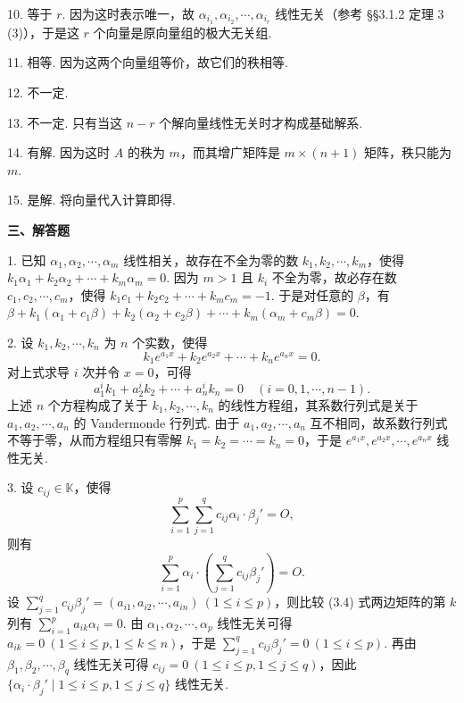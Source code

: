\documentclass[UTF8, 12pt, fontset=fandol, oneside]{ctexart}
\begin{document}
10. 等于 $r$. 因为这时表示唯一，故 $\alpha_{i_1},\alpha_{i_2},\cdots,\alpha_{i_r}$ 线性无关（参考 §§3.1.2 定理 3 (3)），于是这 $r$ 个向量是原向量组的极大无关组.

11. 相等. 因为这两个向量组等价，故它们的秩相等.

12. 不一定.

13. 不一定. 只有当这 $n-r$ 个解向量线性无关时才构成基础解系.

14. 有解. 因为这时 $A$ 的秩为 $m$，而其增广矩阵是 $m\times(n+1)$ 矩阵，秩只能为 $m$.

15. 是解. 将向量代入计算即得.

\noindent\textbf{三、解答题}

1. 已知 $\alpha_1,\alpha_2,\cdots,\alpha_m$ 线性相关，故存在不全为零的数 $k_1,k_2,\cdots,k_m$，使得 $k_1\alpha_1+k_2\alpha_2+\cdots+k_m\alpha_m=0$. 因为 $m>1$ 且 $k_i$ 不全为零，故必存在数 $c_1,c_2,\cdots,c_m$，使得 $k_1c_1+k_2c_2+\cdots+k_mc_m=-1$. 于是对任意的 $\beta$，有 $\beta+k_1(\alpha_1+c_1\beta)+k_2(\alpha_2+c_2\beta)+\cdots+k_m(\alpha_m+c_m\beta)=0$.

2. 设 $k_1,k_2,\cdots,k_n$ 为 $n$ 个实数，使得
\[
k_1e^{a_1x}+k_2e^{a_2x}+\cdots+k_ne^{a_nx}=0.
\]
对上式求导 $i$ 次并令 $x=0$，可得
\[
a_1^ik_1+a_2^ik_2+\cdots+a_n^ik_n=0\quad (i=0,1,\cdots,n-1).
\]
上述 $n$ 个方程构成了关于 $k_1,k_2,\cdots,k_n$ 的线性方程组，其系数行列式是关于 $a_1,a_2,\cdots,a_n$ 的 Vandermonde 行列式. 由于 $a_1,a_2,\cdots,a_n$ 互不相同，故系数行列式不等于零，从而方程组只有零解 $k_1=k_2=\cdots=k_n=0$，于是 $e^{a_1x},e^{a_2x},\cdots,e^{a_nx}$ 线性无关.

3. 设 $c_{ij}\in\mathbb{K}$，使得
\[
\sum_{i=1}^p\sum_{j=1}^q c_{ij}\alpha_i\cdot\beta_j'=O,
\]
则有
\begin{equation}
\sum_{i=1}^p \alpha_i\cdot\left(\sum_{j=1}^q c_{ij}\beta_j'\right)=O.
\tag{3.4}
\end{equation}
设 $\sum_{j=1}^q c_{ij}\beta_j'=(a_{i1},a_{i2},\cdots,a_{in})\ (1\le i\le p)$，则比较 (3.4) 式两边矩阵的第 $k$ 列有 $\sum_{i=1}^p a_{ik}\alpha_i=0$. 由 $\alpha_1,\alpha_2,\cdots,\alpha_p$ 线性无关可得 $a_{ik}=0\ (1\le i\le p,1\le k\le n)$，于是 $\sum_{j=1}^q c_{ij}\beta_j'=0\ (1\le i\le p)$. 再由 $\beta_1,\beta_2,\cdots,\beta_q$ 线性无关可得 $c_{ij}=0\ (1\le i\le p,1\le j\le q)$，因此 $\{\alpha_i\cdot\beta_j'\mid 1\le i\le p,1\le j\le q\}$ 线性无关.
\end{document}
